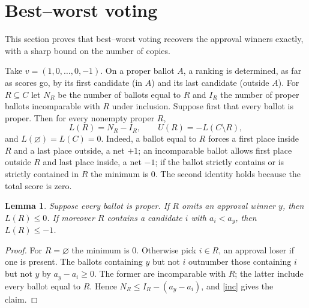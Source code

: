 \documentclass[11pt,a4paper]{article}
\newtheorem{lemma}[theorem]{Lemma}
\theoremstyle{definition}
\theoremstyle{remark}
\begin{document}
\section{Best--worst voting}\label{sec:bw}
This section proves that best--worst voting recovers the approval winners exactly, with a sharp bound on the number of copies.

Take $v=(1,0,\ldots,0,-1)$. On a proper ballot $A$, a ranking is determined, as far as scores go, by its first candidate (in $A$) and its last candidate (outside $A$). For $R\subseteq C$ let $N_R$ be the number of ballots equal to $R$ and $I_R$ the number of proper ballots incomparable with $R$ under inclusion. Suppose first that every ballot is proper. Then for every nonempty proper $R$,
\begin{equation}
 L(R)=N_R-I_R,\qquad U(R)=-L(C\setminus R),\label{inc}
\end{equation}
and $L(\varnothing)=L(C)=0$. Indeed, a ballot equal to $R$ forces a first place inside $R$ and a last place outside, a net $+1$; an incomparable ballot allows first place outside $R$ and last place inside, a net $-1$; if the ballot strictly contains or is strictly contained in $R$ the minimum is $0$. The second identity holds because the total score is zero.

\begin{lemma}\label{omit}
Suppose every ballot is proper. If $R$ omits an approval winner $y$, then $L(R)\le0$. If moreover $R$ contains a candidate $i$ with $a_i<a_y$, then $L(R)\le-1$.
\end{lemma}
\begin{proof}
For $R=\varnothing$ the minimum is $0$. Otherwise pick $i\in R$, an approval loser if one is present. The ballots containing $y$ but not $i$ outnumber those containing $i$ but not $y$ by $a_y-a_i\ge0$. The former are incomparable with $R$; the latter include every ballot equal to $R$. Hence $N_R\le I_R-(a_y-a_i)$, and \eqref{inc} gives the claim.
\end{proof}
\end{document}
